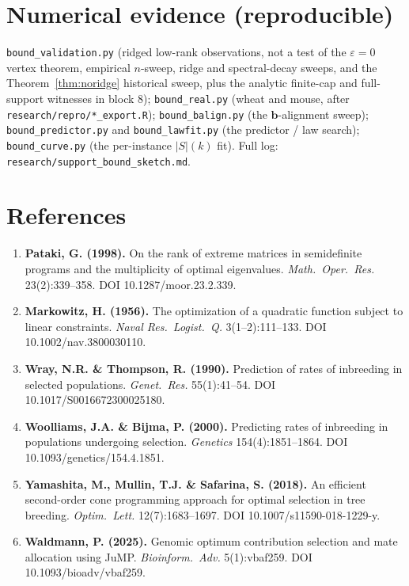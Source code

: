 \documentclass[11pt]{article}
\theoremstyle{plain}
\newcommand{\bb}{\mathbf{b}}
\begin{document}
\section*{Numerical evidence (reproducible)}

\begin{sloppypar}
\texttt{bound\_validation.py} (ridged low-rank observations, not a test of the $\varepsilon=0$ vertex theorem, empirical $n$-sweep, ridge and
spectral-decay sweeps, and the Theorem~\ref{thm:noridge} historical sweep, plus the analytic finite-cap and full-support witnesses in block 8);
\texttt{bound\_real.py} (wheat and mouse, after \texttt{research/repro/*\_export.R});
\texttt{bound\_balign.py} (the $\bb$-alignment sweep); \texttt{bound\_predictor.py} and
\texttt{bound\_lawfit.py} (the predictor / law search); \texttt{bound\_curve.py} (the
per-instance $|S|(k)$ fit). Full log: \texttt{research/support\_bound\_sketch.md}.
\end{sloppypar}

\section*{References}
\sloppy
\begin{enumerate}[leftmargin=2em]
\item \textbf{Pataki, G. (1998).} On the rank of extreme matrices in semidefinite programs and the multiplicity of optimal eigenvalues. \emph{Math.\ Oper.\ Res.} 23(2):339--358. DOI 10.1287/moor.23.2.339.
\item \textbf{Markowitz, H. (1956).} The optimization of a quadratic function subject to linear constraints. \emph{Naval Res.\ Logist.\ Q.} 3(1--2):111--133. DOI 10.1002/nav.3800030110.
\item \textbf{Wray, N.R. \& Thompson, R. (1990).} Prediction of rates of inbreeding in selected populations. \emph{Genet.\ Res.} 55(1):41--54. DOI 10.1017/S0016672300025180.
\item \textbf{Woolliams, J.A. \& Bijma, P. (2000).} Predicting rates of inbreeding in populations undergoing selection. \emph{Genetics} 154(4):1851--1864. DOI 10.1093/genetics/154.4.1851.
\item \textbf{Yamashita, M., Mullin, T.J. \& Safarina, S. (2018).} An efficient second-order cone programming approach for optimal selection in tree breeding. \emph{Optim.\ Lett.} 12(7):1683--1697. DOI 10.1007/s11590-018-1229-y.
\item \textbf{Waldmann, P. (2025).} Genomic optimum contribution selection and mate allocation using JuMP. \emph{Bioinform.\ Adv.} 5(1):vbaf259. DOI 10.1093/bioadv/vbaf259.
\end{enumerate}
\end{document}
